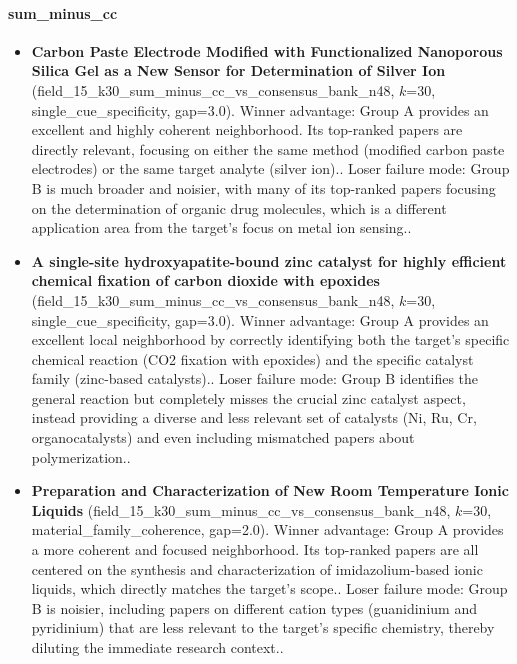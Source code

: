 \paragraph{sum\_minus\_cc}
\begin{itemize}
\item \textbf{Carbon Paste Electrode Modified with Functionalized Nanoporous Silica Gel as a New Sensor for Determination of Silver Ion} (field\_15\_k30\_sum\_minus\_cc\_vs\_consensus\_bank\_n48, $k$=30, single\_cue\_specificity, gap=3.0). Winner advantage: Group A provides an excellent and highly coherent neighborhood. Its top-ranked papers are directly relevant, focusing on either the same method (modified carbon paste electrodes) or the same target analyte (silver ion).. Loser failure mode: Group B is much broader and noisier, with many of its top-ranked papers focusing on the determination of organic drug molecules, which is a different application area from the target's focus on metal ion sensing..
\item \textbf{A single-site hydroxyapatite-bound zinc catalyst for highly efficient chemical fixation of carbon dioxide with epoxides} (field\_15\_k30\_sum\_minus\_cc\_vs\_consensus\_bank\_n48, $k$=30, single\_cue\_specificity, gap=3.0). Winner advantage: Group A provides an excellent local neighborhood by correctly identifying both the target's specific chemical reaction (CO2 fixation with epoxides) and the specific catalyst family (zinc-based catalysts).. Loser failure mode: Group B identifies the general reaction but completely misses the crucial zinc catalyst aspect, instead providing a diverse and less relevant set of catalysts (Ni, Ru, Cr, organocatalysts) and even including mismatched papers about polymerization..
\item \textbf{Preparation and Characterization of New Room Temperature Ionic Liquids} (field\_15\_k30\_sum\_minus\_cc\_vs\_consensus\_bank\_n48, $k$=30, material\_family\_coherence, gap=2.0). Winner advantage: Group A provides a more coherent and focused neighborhood. Its top-ranked papers are all centered on the synthesis and characterization of imidazolium-based ionic liquids, which directly matches the target's scope.. Loser failure mode: Group B is noisier, including papers on different cation types (guanidinium and pyridinium) that are less relevant to the target's specific chemistry, thereby diluting the immediate research context..

\end{itemize}
